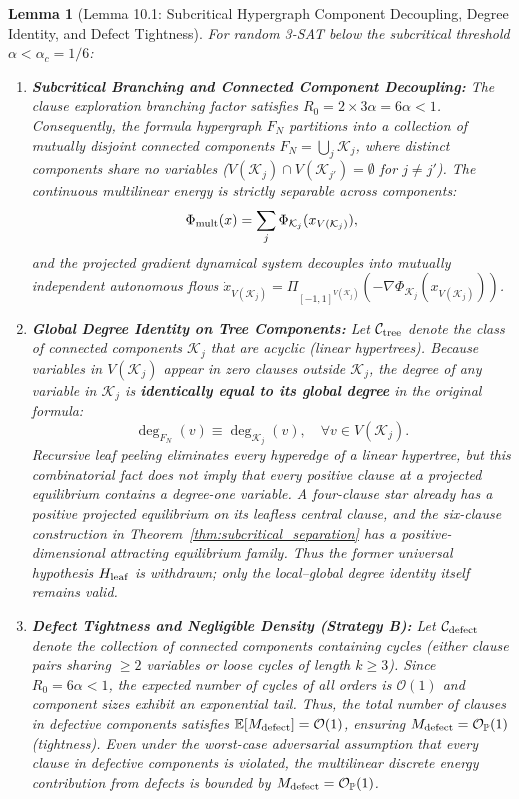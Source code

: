 \documentclass[11pt,a4paper]{article}
\newtheorem{lemma}[theorem]{Lemma}
\begin{document}
\begin{lemma}[Lemma 10.1: Subcritical Hypergraph Component Decoupling, Degree Identity, and Defect Tightness]
\label{lem:peeling}
For random 3-SAT below the subcritical threshold $\alpha < \alpha_c = 1/6$:
\begin{enumerate}
    \item \textbf{Subcritical Branching and Connected Component Decoupling:} The clause exploration branching factor satisfies $R_0 = 2 \times 3\alpha = 6\alpha < 1$. Consequently, the formula hypergraph $F_N$ partitions into a collection of mutually disjoint connected components $F_N = \bigcup_j \mathcal{K}_j$, where distinct components share no variables ($V(\mathcal{K}_j) \cap V(\mathcal{K}_{j'}) = \emptyset$ for $j \ne j'$). The continuous multilinear energy is strictly separable across components:
    \begin{equation}
    \Phi_{\rm mult}(x) = \sum_j \Phi_{\mathcal{K}_j}(x_{V(\mathcal{K}_j)}),
    \end{equation}
    and the projected gradient dynamical system decouples into mutually independent autonomous flows $\dot{x}_{V(\mathcal{K}_j)} = \Pi_{[-1, 1]^{V(\mathcal{K}_j)}}(-\nabla \Phi_{\mathcal{K}_j}(x_{V(\mathcal{K}_j)}))$.
    \item \textbf{Global Degree Identity on Tree Components:} Let $\mathcal{C}_{\rm tree}$ denote the class of connected components $\mathcal{K}_j$ that are acyclic (linear hypertrees). Because variables in $V(\mathcal{K}_j)$ appear in zero clauses outside $\mathcal{K}_j$, the degree of any variable in $\mathcal{K}_j$ is \textbf{identically equal to its global degree} in the original formula:
    \begin{equation}
    \deg_{F_N}(v) \equiv \deg_{\mathcal{K}_j}(v), \quad \forall v \in V(\mathcal{K}_j).
    \end{equation}
    Recursive leaf peeling eliminates every hyperedge of a linear hypertree, but this combinatorial fact does \emph{not} imply that every positive clause at a projected equilibrium contains a degree-one variable. A four-clause star already has a positive projected equilibrium on its leafless central clause, and the six-clause construction in Theorem~\ref{thm:subcritical_separation} has a positive-dimensional attracting equilibrium family. Thus the former universal hypothesis $H_{\rm leaf}$ is withdrawn; only the local--global degree identity itself remains valid.
    \item \textbf{Defect Tightness and Negligible Density (Strategy B):} Let $\mathcal{C}_{\rm defect}$ denote the collection of connected components containing cycles (either clause pairs sharing $\ge 2$ variables or loose cycles of length $k \ge 3$). Since $R_0 = 6\alpha < 1$, the expected number of cycles of all orders is $\mathcal{O}(1)$ and component sizes exhibit an exponential tail. Thus, the total number of clauses in defective components satisfies $\mathbb{E}[M_{\rm defect}] = \mathcal{O}(1)$, ensuring $M_{\rm defect} = \mathcal{O}_{\mathbb{P}}(1)$ (tightness). Even under the worst-case adversarial assumption that every clause in defective components is violated, the multilinear discrete energy contribution from defects is bounded by $M_{\rm defect} = \mathcal{O}_{\mathbb{P}}(1)$.

\end{enumerate}
\end{lemma}
\end{document}
